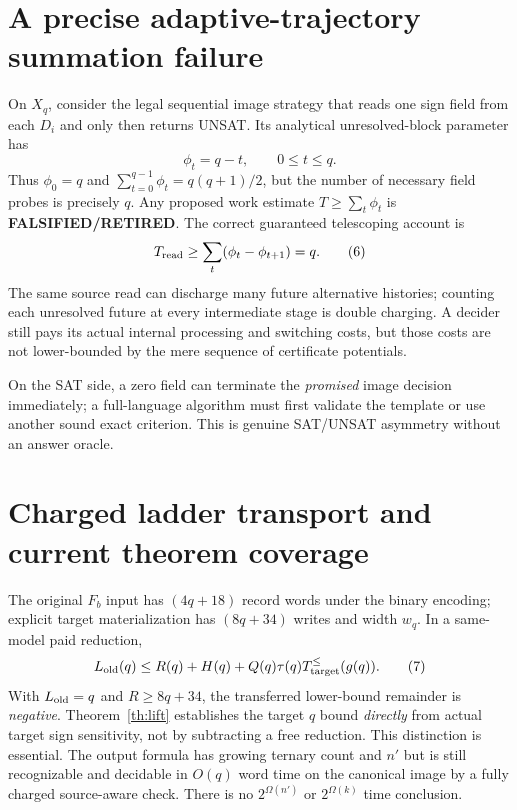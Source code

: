 \documentclass[11pt]{article}
\begin{document}
\section{A precise adaptive-trajectory summation failure}
On $X_q$, consider the legal sequential image strategy that
reads one sign field from each $D_i$ and only then returns
UNSAT. Its analytical unresolved-block parameter has
\[
\phi_t=q-t,\qquad0\le t\le q.
\]
Thus $\phi_0=q$ and $\sum_{t=0}^{q-1}\phi_t=q(q+1)/2$,
but the number of necessary field probes is precisely $q$.
Any proposed work estimate $T\ge\sum_t\phi_t$ is
\textbf{FALSIFIED/RETIRED}. The correct guaranteed telescoping
account is
\[
T_{\rm read}\ge\sum_t(\phi_t-\phi_{t+1})=q.\tag{6}
\]
The same source read can discharge many future alternative
histories; counting each unresolved future at every intermediate
stage is double charging. A decider still pays its actual
internal processing and switching costs, but those costs are
not lower-bounded by the mere sequence of certificate potentials.

On the SAT side, a zero field can terminate the \emph{promised}
image decision immediately; a full-language algorithm must first
validate the template or use another sound exact criterion.
This is genuine SAT/UNSAT asymmetry without an answer oracle.

\section{Charged ladder transport and current theorem coverage}
The original $F_b$ input has $(4q+18)$ record words under the
binary encoding; explicit target materialization has $(8q+34)$
writes and width $w_q$. In a same-model paid reduction,
\[
L_{\rm old}(q)\le R(q)+H(q)+Q(q)\tau(q)
  T_{\rm target}^{\le}(g(q)).\tag{7}
\]
With $L_{\rm old}=q$ and $R\ge8q+34$, the transferred
lower-bound remainder is \emph{negative}.
Theorem~\ref{th:lift} establishes the target $q$ bound
\emph{directly} from actual target sign sensitivity, not by
subtracting a free reduction. This distinction is essential.
The output formula has growing ternary count and $n'$ but
is still recognizable and decidable in $O(q)$ word time on
the canonical image by a fully charged source-aware check.
There is no $2^{\Omega(n')}$ or $2^{\Omega(k)}$ time conclusion.
\end{document}
